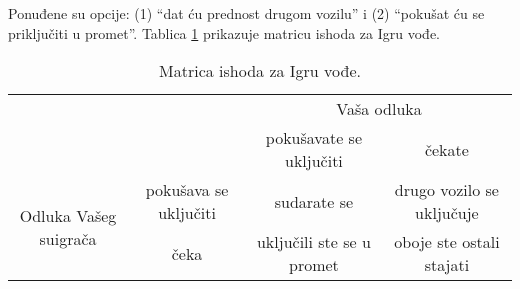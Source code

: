 \documentclass[a4paper, 12pt]{report}
\begin{document}
\begin{appendices}
Ponuđene su opcije: (1) \enquote{dat ću prednost drugom vozilu} i (2)
\enquote{pokušat ću se priključiti u promet}. Tablica \ref{ivtab} prikazuje matricu ishoda
za Igru vođe. 

\begin{table}[!h]
\centering 
    \caption{Matrica ishoda za Igru vođe.\label{ivtab}}
\hspace*{-0.5cm}\begin{tabular}{cccc}
\toprule[1pt]
    & & \multicolumn{2}{c}{Vaša odluka}\\
    & & pokušavate se uključiti& čekate\\
    \cmidrule[0.5pt]{3-4}
    \multirow{2}{*}{Odluka Vašeg suigrača} & pokušava se uključiti& sudarate se
    & drugo vozilo se uključuje  \\
    & čeka & uključili ste se u promet & oboje ste ostali stajati\\
	\bottomrule[1pt]
\end{tabular}
\end{table}

\end{appendices}



{
    
}
\end{document}
